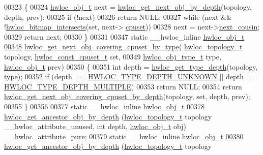 \begin{DoxyCode}
00323 \{
00324   \hyperlink{a00238}{hwloc\_obj\_t} next = \hyperlink{a00187_gac140a9b939d9fa0b30c4a910efcb0656}{hwloc\_get\_next\_obj\_by\_depth}(topology, depth, 
      prev);
00325   \textcolor{keywordflow}{if} (!next)
00326     \textcolor{keywordflow}{return} NULL;
00327   \textcolor{keywordflow}{while} (next && !\hyperlink{a00205_gaefa070f9232857ba5a57297ea9a08ea2}{hwloc\_bitmap\_intersects}(\textcolor{keyword}{set}, next->
      \hyperlink{a00238_a67925e0f2c47f50408fbdb9bddd0790f}{cpuset}))
00328     next = next->\hyperlink{a00238_a85a788017457129589318b6c39451acf}{next\_cousin};
00329   \textcolor{keywordflow}{return} next;
00330 \}
00331 
00347 \textcolor{keyword}{static} \_\_hwloc\_inline \hyperlink{a00238}{hwloc\_obj\_t}
\hyperlink{a00196_ga91cfae08b092e7966002e15d1e987213}{00348} \hyperlink{a00196_ga91cfae08b092e7966002e15d1e987213}{hwloc\_get\_next\_obj\_covering\_cpuset\_by\_type}(
      \hyperlink{a00186_ga9d1e76ee15a7dee158b786c30b6a6e38}{hwloc\_topology\_t} topology, \hyperlink{a00183_ga1f784433e9b606261f62d1134f6a3b25}{hwloc\_const\_cpuset\_t} \textcolor{keyword}{set},
00349                                            \hyperlink{a00184_gacd37bb612667dc437d66bfb175a8dc55}{hwloc\_obj\_type\_t} type, 
      \hyperlink{a00238}{hwloc\_obj\_t} prev)
00350 \{
00351   \textcolor{keywordtype}{int} depth = \hyperlink{a00187_ga8bec782e21be313750da70cf7428b374}{hwloc\_get\_type\_depth}(topology, type);
00352   \textcolor{keywordflow}{if} (depth == \hyperlink{a00187_ggaf4e663cf42bbe20756b849c6293ef575a0565ab92ab72cb0cec91e23003294aad}{HWLOC\_TYPE\_DEPTH\_UNKNOWN} || depth == 
      \hyperlink{a00187_ggaf4e663cf42bbe20756b849c6293ef575ae99465995cacde6c210d5fc2e409798c}{HWLOC\_TYPE\_DEPTH\_MULTIPLE})
00353     \textcolor{keywordflow}{return} NULL;
00354   \textcolor{keywordflow}{return} \hyperlink{a00196_gaba4b6d86eba1169ced4b0e941d2bb5f0}{hwloc\_get\_next\_obj\_covering\_cpuset\_by\_depth}(topology, \textcolor{keyword}{
      set}, depth, prev);
00355 \}
00356 
00377 \textcolor{keyword}{static} \_\_hwloc\_inline \hyperlink{a00238}{hwloc\_obj\_t}
00378 \hyperlink{a00197_ga9f8c93fde236e9642a96957af01a11cb}{hwloc\_get\_ancestor\_obj\_by\_depth} (\hyperlink{a00186_ga9d1e76ee15a7dee158b786c30b6a6e38}{hwloc\_topology\_t} topology 
      \_\_hwloc\_attribute\_unused, \textcolor{keywordtype}{int} depth, \hyperlink{a00238}{hwloc\_obj\_t} obj) \_\_hwloc\_attribute\_pure;
00379 \textcolor{keyword}{static} \_\_hwloc\_inline \hyperlink{a00238}{hwloc\_obj\_t}
\hyperlink{a00197_ga9f8c93fde236e9642a96957af01a11cb}{00380} \hyperlink{a00197_ga9f8c93fde236e9642a96957af01a11cb}{hwloc\_get\_ancestor\_obj\_by\_depth} (\hyperlink{a00186_ga9d1e76ee15a7dee158b786c30b6a6e38}{hwloc\_topology\_t} topology 

\end{DoxyCode}
